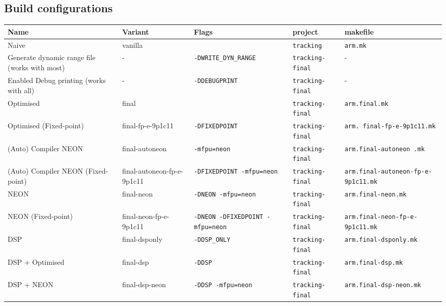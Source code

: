 \documentclass[final]{article} %
\begin{document}
\begin{appendices}
\section{Build configurations}
\begin{table}[H]
	\centering
	\begin{tabular}{>{\raggedright}p{2.5cm}l>{\raggedright}p{3cm}ll}
	\toprule
	\textbf{Name}								& \textbf{Variant}			 & \textbf{Flags}							& \textbf{project}			& \textbf{makefile}	\\
	\midrule
	Naive										& vanilla 					 & \texttt{}								& \texttt{tracking}			& \texttt{arm.mk}	\\
	Generate dynamic range file	(works with most)& - 						 & \texttt{-DWRITE\_DYN\_RANGE}				& \texttt{tracking-final}	& -	\\
	Enabled Debug printing	(works with all)    & - 						 & \texttt{-DDEBUGPRINT}					& \texttt{tracking-final}	& -	\\
	Optimised									& final 					 & \texttt{}								& \texttt{tracking-final}	& \texttt{arm.final.mk}	\\
	Optimised (Fixed-point)						& final-fp-e-9p1c11			 & \texttt{-DFIXEDPOINT}	    			& \texttt{tracking-final}	& \texttt{arm. final-fp-e-9p1c11.mk}	\\
	(Auto) Compiler NEON						& final-autoneon 			 & \texttt{-mfpu=neon}		    			& \texttt{tracking-final}	& \texttt{arm.final-autoneon .mk}	\\
	(Auto) Compiler NEON (Fixed-point)			& final-autoneon-fp-e-9p1c11 & \texttt{-DFIXEDPOINT -mfpu=neon}		    & \texttt{tracking-final}	& \texttt{arm.final-autoneon-fp-e-9p1c11.mk}	\\
	NEON										& final-neon 				 & \texttt{-DNEON -mfpu=neon}		    	& \texttt{tracking-final}	& \texttt{arm.final-neon.mk}	\\
	NEON (Fixed-point)							& final-neon-fp-e-9p1c11	 & \texttt{-DNEON -DFIXEDPOINT -mfpu=neon}	& \texttt{tracking-final}	& \texttt{arm.final-neon-fp-e-9p1c11.mk}	\\
	DSP											& final-dsponly				 & \texttt{-DDSP\_ONLY}						& \texttt{tracking-final}	& \texttt{arm.final-dsponly.mk}	\\
	DSP + Optimised								& final-dsp 				 & \texttt{-DDSP}							& \texttt{tracking-final}	& \texttt{arm.final-dsp.mk}	\\
	DSP + NEON									& final-dsp-neon 			 & \texttt{-DDSP -mfpu=neon}				& \texttt{tracking-final}	& \texttt{arm.final-dsp-neon.mk}	\\
	\bottomrule
	\end{tabular}
\end{table}


\end{appendices}
\end{document}
